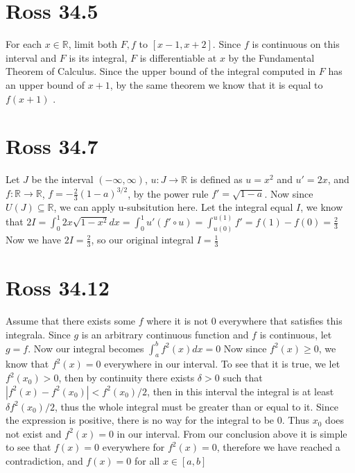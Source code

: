 \documentclass[12pt]{article}
\newcommand{\R}{\mathbb{R}}
\begin{document}
\section{Ross 34.5}
For each $x \in \R$, limit both $F,f$ to $[x-1,x+2]$. Since $f$ is continuous on this interval and $F$ is its integral, $F$ is differentiable at $x$ by the Fundamental Theorem of Calculus.
\newline
Since the upper bound of the integral computed in $F$ has an upper bound of $x+1$, by the same theorem we know that it is equal to $f(x+1)$ .
\newpage


\section{Ross 34.7}
Let $J$ be the interval $(-\infty, \infty)$, $u:J \to \R $ is defined as $u=x^2$ and $u' = 2x$, and $f: \R \to \R$, $f = -\frac{2}{3}(1-a)^{3/2}$, by the power rule $f' = \sqrt{1-a}$. Now since $U(J) \subseteq \R$, we can apply u-subsitution here.
\newline
Let the integral equal $I$, we know that $2I = \int_0^1 2x \sqrt{1-x^2} dx= \int_0^1 u'(f'\circ u) = \int_{u(0)}^{u(1)}f' = f(1)-f(0) = \frac{2}{3}$
\newline
Now we have $2I = \frac{2}{3}$, so our original integral $I = \frac{1}{3}$
\newpage

\section{Ross 34.12}
Assume that there exists some $f$ where it is not $0$ everywhere that satisfies this integrala. Since $g$ is an arbitrary continuous function and $f$ is continuous, let $g=f$. Now our integral becomes $\int_a^b f^2(x)dx = 0$
Now since $f^2(x) \geq 0$, we know that $f^2(x) = 0$ everywhere in our interval.
\newline
To see that it is true, we let $f^2(x_0) > 0$, then by continuity there exists $\delta > 0$ such that $|f^2(x)-f^2(x_0)|< f^2(x_0)/2$, then in this interval the integral is at least $\delta f^2(x_0)/2$, thus the whole integral must be greater than or equal to it. Since the expression is positive, there is no way for the integral to be 0. Thus $x_0$ does not exist and $f^2(x)=0$ in our interval.
\newline
From our conclusion above it is simple to see that $f(x)=0$ everywhere for $f^2(x)=0$, therefore we have reached a contradiction, and $f(x)=0$ for all $x \in [a,b]$
\end{document}
